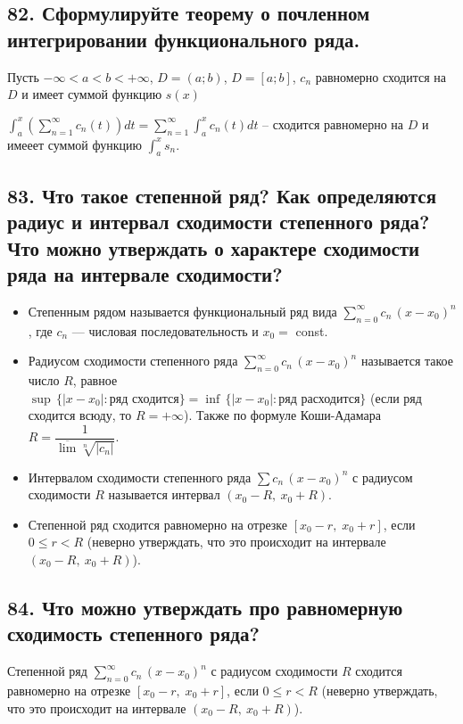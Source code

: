 \documentclass[a4paper, fleqn]{article}
\begin{document}
        \subsection*{82. Сформулируйте теорему о почленном интегрировании функционального ряда.}
        Пусть $-\infty < a < b < +\infty$, $D= (a; b)$, $D = [a; b]$, $c_n$ равномерно сходится на $D$ и имеет суммой функцию $s(x)$

        $\int_{a}^{x}\left(\sum_{n=1}^{\infty} c_n(t)\right) dt = \sum_{n=1}^{\infty} \int_{a}^{x} c_n(t) dt$ -- сходится равномерно на $D$ и имееет суммой функцию $\int_a^x s_n$.
    
    \subsection*{83. Что такое степенной ряд? Как определяются радиус и интервал сходимости степенного ряда? 
    Что можно утверждать о характере сходимости ряда на интервале сходимости?}

    \begin{itemize}
        \item Степенным рядом называется функциональный ряд вида $\sum \limits_{n = 0}^{\infty} c_n \, (x - x_0)^n$, 
    где $c_n$ --- числовая последовательность и $x_0 =$ const.

        \item Радиусом сходимости степенного ряда $\sum \limits_{n = 0}^{\infty} c_n \, (x - x_0)^n$ называется такое число $R$,
    равное \\ ${\sup \, \bigl\{|x - x_0| : \text{ряд сходится}\bigr\}} = {\inf \, \bigl\{|x - x_0| : \text{ряд расходится}\bigr\}}$
    (если ряд сходится всюду, то ${R = +\infty}$). Также по формуле Коши-Адамара $R = \dfrac1{\overline{\lim} \sqrt[n]{|c_n|}}$.

        \item Интервалом сходимости степенного ряда $\sum c_n \, (x - x_0)^n$ с радиусом сходимости $R$ называется интервал $(x_0 - R, \: x_0 + R)$.

        \item Степенной ряд сходится равномерно на отрезке $[x_0 - r, \; x_0 + r]$, если $0 \leqslant r < R$ 
    (неверно утверждать, что это происходит на интервале $(x_0 - R, \: x_0 + R)$). 
    \end{itemize}
        
    \subsection*{84. Что можно утверждать про равномерную сходимость степенного ряда?}
    Степенной ряд $\sum \limits_{n = 0}^{\infty} c_n \, (x - x_0)^n$ с радиусом сходимости $R$ сходится равномерно 
    на отрезке $[x_0 - r, \; x_0 + r]$, если $0 \leqslant r < R$ 
    (неверно утверждать, что это происходит на интервале $(x_0 - R, \: x_0 + R)$). 
        
\end{document}
